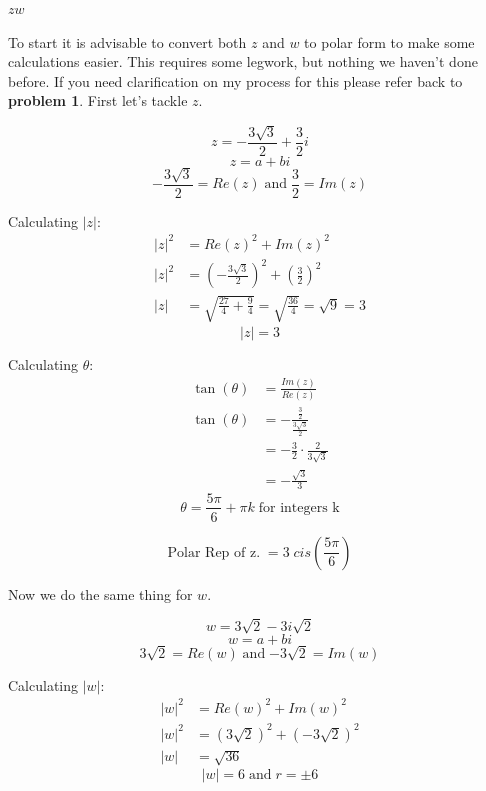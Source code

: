 \begin{problem}[41.]
    $zw$
\end{problem}

\begin{solution}
    To start it is advisable to convert both $z$ and $w$ to polar form to make some calculations easier. This requires some legwork, but nothing we haven't done before. If you need clarification on my process for this please refer back to \textbf{problem 1}. First let's tackle $z$. 
    
        \[z = -\frac{3\sqrt{3}}{2} + \frac{3}{2} i \] 
        \[z = a + bi\]
        \[ \boxed{-\frac{3\sqrt{3}}{2} = Re(z)} \; \text{and} \; \boxed{ \frac{3}{2} = Im(z) }\]
        
        Calculating $|z|$:
        \begin{align}
            |z|^2 &= Re(z)^2 + Im(z)^2 \\
            |z|^2 &= \left( -\frac{3\sqrt{3}}{2} \right)^2 + \left( \frac{3}{2} \right)^2 \\ 
            |z| &= \sqrt{ \frac{27}{4} + \frac{9}{4} } = \sqrt{\frac{36}{4} } = \sqrt{9} = 3
        \end{align}
        \[\boxed{|z| = 3}\]
        
        Calculating $\theta$:
        \begin{align}
            \tan(\theta) &= \frac{Im(z)}{Re(z)} \\
            \tan(\theta) &= -\frac{ \frac{3}{2} }{ \frac{3\sqrt{3}}{2} } \\
            &= -\frac{3}{2} \cdot \frac{2}{3\sqrt{3}} \\
            &= -\frac{\sqrt{3}}{3}
        \end{align}
        \[\boxed{\theta = \frac{5\pi}{6} + \pi k \; \text{for integers k}}\]
        
        \[\boxed{ \text{Polar Rep of z.} \; = 3 \; cis \left( \frac{5\pi}{6} \right) }\]
        
        \pagebreak
        
        Now we do the same thing for $w$.
        
        \[w = 3\sqrt{2} - 3i \sqrt{2}\]
        \[w = a + bi\]
        \[ \boxed{3\sqrt{2} = Re(w)} \; \text{and} \; \boxed{ -3\sqrt{2} = Im(w) }\]
        
        Calculating $|w|$:
        \
        \begin{align}
            |w|^2 &= Re(w)^2 + Im(w)^2 \\
            |w|^2 &= (3\sqrt{2})^2 + (- 3\sqrt{2})^2 \\
            |w| &= \sqrt{36}
        \end{align}
        \[\boxed{|w| = 6 \; \text{and} \; r = \pm 6}\]
        

\end{solution}
